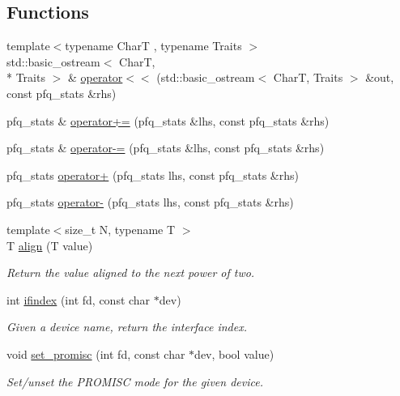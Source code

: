 \subsection*{Functions}
\begin{DoxyCompactItemize}
\item 
{\footnotesize template$<$typename Char\-T , typename Traits $>$ }\\std\-::basic\-\_\-ostream$<$ Char\-T, \\*
Traits $>$ \& \hyperlink{namespacenet_a1ab74b3fbda394416976dd625503a078}{operator$<$$<$} (std\-::basic\-\_\-ostream$<$ Char\-T, Traits $>$ \&out, const pfq\-\_\-stats \&rhs)
\item 
pfq\-\_\-stats \& \hyperlink{namespacenet_a97dfc6472f0404f741317f44fe7c8a79}{operator+=} (pfq\-\_\-stats \&lhs, const pfq\-\_\-stats \&rhs)
\item 
pfq\-\_\-stats \& \hyperlink{namespacenet_aa8c788b080185a895293a937e8141494}{operator-\/=} (pfq\-\_\-stats \&lhs, const pfq\-\_\-stats \&rhs)
\item 
pfq\-\_\-stats \hyperlink{namespacenet_ad84b92ba6450be8c2443e22762a6feba}{operator+} (pfq\-\_\-stats lhs, const pfq\-\_\-stats \&rhs)
\item 
pfq\-\_\-stats \hyperlink{namespacenet_a1bb30b2de2baf79e64eed4afde75f50c}{operator-\/} (pfq\-\_\-stats lhs, const pfq\-\_\-stats \&rhs)
\item 
{\footnotesize template$<$size\-\_\-t N, typename T $>$ }\\T \hyperlink{namespacenet_ac59f25900e63bf19f99bbcb44824b134}{align} (T value)
\begin{DoxyCompactList}\small\item\em Return the value aligned to the next power of two. \end{DoxyCompactList}\item 
int \hyperlink{namespacenet_a01d1d9ebab237e4740263e2deba1ab1d}{ifindex} (int fd, const char $\ast$dev)
\begin{DoxyCompactList}\small\item\em Given a device name, return the interface index. \end{DoxyCompactList}\item 
void \hyperlink{namespacenet_a69de0e47b041dff359c54fe92eb8830a}{set\-\_\-promisc} (int fd, const char $\ast$dev, bool value)
\begin{DoxyCompactList}\small\item\em Set/unset the P\-R\-O\-M\-I\-S\-C mode for the given device. \end{DoxyCompactList}\item 

\end{DoxyCompactItemize}
